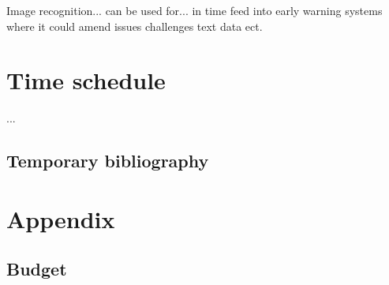 \documentclass[a4paper]{article}
\begin{document}

Image recognition... can be used for... in time feed into early warning systems where it could amend issues challenges text data ect.





\section{Time schedule} 
...

\subsection{Temporary bibliography}
 


\pagebreak
\section{Appendix}

\subsection{Budget}
\end{document}
